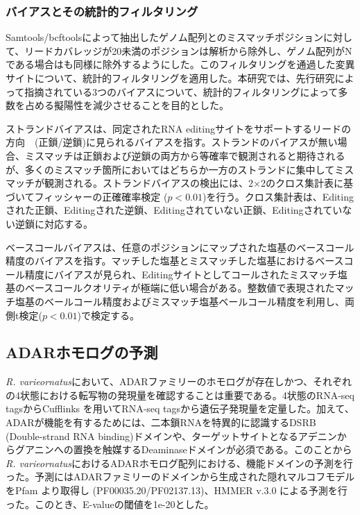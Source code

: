 \subsubsection{バイアスとその統計的フィルタリング}
Samtools/bcftoolsによって抽出したゲノム配列とのミスマッチポジションに対して、リードカバレッジが20未満のポジションは解析から除外し、ゲノム配列がNである場合はも同様に除外するようにした。このフィルタリングを通過した変異サイトについて、統計的フィルタリングを適用した。本研究では、先行研究によって指摘されている3つのバイアスについて、統計的フィルタリングによって多数を占める擬陽性を減少させることを目的とした。
\par
ストランドバイアスは、同定されたRNA editingサイトをサポートするリードの方向　(正鎖/逆鎖)に見られるバイアスを指す。ストランドのバイアスが無い場合、ミスマッチは正鎖および逆鎖の両方から等確率で観測されると期待されるが、多くのミスマッチ箇所においてはどちらか一方のストランドに集中してミスマッチが観測される。ストランドバイアスの検出には、2×2のクロス集計表に基づいてフィッシャーの正確確率検定 ($p<0.01$)を行う。クロス集計表は、Editingされた正鎖、Editingされた逆鎖、Editingされていない正鎖、Editingされていない逆鎖に対応する。
\par
ベースコールバイアスは、任意のポジションにマップされた塩基のベースコール精度のバイアスを指す。マッチした塩基とミスマッチした塩基におけるベースコール精度にバイアスが見られ、Editingサイトとしてコールされたミスマッチ塩基のベースコールクオリティが極端に低い場合がある。整数値で表現されたマッチ塩基のベールコール精度およびミスマッチ塩基ベールコール精度を利用し、両側t検定($p<0.01$)で検定する。

\subsection{ADARホモログの予測}
{\it R. varieornatus}において、ADARファミリーのホモログが存在しかつ、それぞれの4状態における転写物の発現量を確認することは重要である。4状態のRNA-seq tagsからCufflinks \citep{pmid22383036}を用いてRNA-seq tagsから遺伝子発現量を定量した。加えて、ADARが機能を有するためには、二本鎖RNAを特異的に認識するDSRB (Double-strand RNA binding)ドメインや、ターゲットサイトとなるアデニンからグアニンへの置換を触媒するDeaminaseドメインが必須である。このことから{\it R. varieornatus}におけるADARホモログ配列における、機能ドメインの予測を行った。予測にはADARファミリーのドメインから生成された隠れマルコフモデルをPfam \citep{pmid22127870}より取得し (PF00035.20/PF02137.13)、HMMER v.3.0 \citep{pmid22039361}による予測を行った。このとき、E-valueの閾値を1e-20とした。

